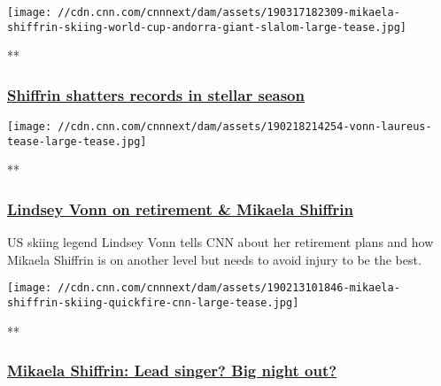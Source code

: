\texttt{[image: //cdn.cnn.com/cnnnext/dam/assets/190317182309-mikaela-shiffrin-skiing-world-cup-andorra-giant-slalom-large-tease.jpg]}

**

\hypertarget{shiffrin-shatters-records-in-stellar-season}{%
\subsubsection{\texorpdfstring{\href{/videos/sports/2019/03/18/mikaela-shiffrin-skiing-world-cup-alpine-edge-andorra.cnn}{Shiffrin
shatters records in stellar
season}}{Shiffrin shatters records in stellar season}}\label{shiffrin-shatters-records-in-stellar-season}}

\href{/videos/sports/2019/02/19/lindsey-vonn-retirement-plans-mikaela-shiffrin-future-alpine-edge-spt-intl.cnn}{}

\texttt{[image: //cdn.cnn.com/cnnnext/dam/assets/190218214254-vonn-laureus-tease-large-tease.jpg]}

**

\hypertarget{lindsey-vonn-on-retirement--mikaela-shiffrin}{%
\subsubsection{\texorpdfstring{\href{/videos/sports/2019/02/19/lindsey-vonn-retirement-plans-mikaela-shiffrin-future-alpine-edge-spt-intl.cnn}{Lindsey
Vonn on retirement \& Mikaela
Shiffrin}}{Lindsey Vonn on retirement \& Mikaela Shiffrin}}\label{lindsey-vonn-on-retirement--mikaela-shiffrin}}

US skiing legend Lindsey Vonn tells CNN about her retirement plans and
how Mikaela Shiffrin is on another level but needs to avoid injury to be
the best.

\href{/videos/sports/2019/02/13/mikaela-shiffrin-quickfire-challenge-skiing-fun-alpine-edge-vision-spt-intl.cnn}{}

\texttt{[image: //cdn.cnn.com/cnnnext/dam/assets/190213101846-mikaela-shiffrin-skiing-quickfire-cnn-large-tease.jpg]}

**

\hypertarget{mikaela-shiffrin-lead-singer-big-night-out}{%
\subsubsection{\texorpdfstring{\href{/videos/sports/2019/02/13/mikaela-shiffrin-quickfire-challenge-skiing-fun-alpine-edge-vision-spt-intl.cnn}{Mikaela
Shiffrin: Lead singer? Big night
out?}}{Mikaela Shiffrin: Lead singer? Big night out?}}\label{mikaela-shiffrin-lead-singer-big-night-out}}

